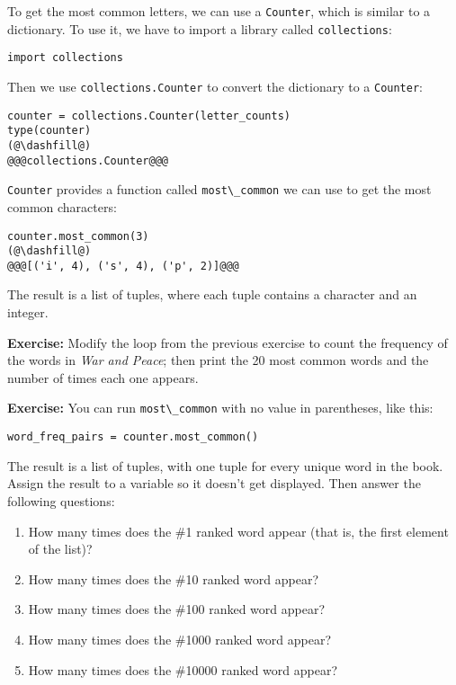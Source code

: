 To get the most common letters, we can use a
\passthrough{\lstinline!Counter!}, which is similar to a dictionary. To
use it, we have to import a library called
\passthrough{\lstinline!collections!}:

\begin{lstlisting}[]
import collections
\end{lstlisting}

Then we use \passthrough{\lstinline!collections.Counter!} to convert the
dictionary to a \passthrough{\lstinline!Counter!}:

\begin{lstlisting}[]
counter = collections.Counter(letter_counts)
type(counter)
(@\dashfill@)
@@@collections.Counter@@@
\end{lstlisting}

\passthrough{\lstinline!Counter!} provides a function called
\passthrough{\lstinline!most\_common!} we can use to get the most common
characters:

\begin{lstlisting}[]
counter.most_common(3)
(@\dashfill@)
@@@[('i', 4), ('s', 4), ('p', 2)]@@@
\end{lstlisting}

The result is a list of tuples, where each tuple contains a character
and an integer.

\textbf{Exercise:} Modify the loop from the previous exercise to count
the frequency of the words in \emph{War and Peace}; then print the 20
most common words and the number of times each one appears.

\textbf{Exercise:} You can run \passthrough{\lstinline!most\_common!}
with no value in parentheses, like this:

\begin{lstlisting}
word_freq_pairs = counter.most_common()
\end{lstlisting}

The result is a list of tuples, with one tuple for every unique word in
the book. Assign the result to a variable so it doesn't get displayed.
Then answer the following questions:

\begin{enumerate}
\def\labelenumi{\arabic{enumi}.}
\item
  How many times does the \#1 ranked word appear (that is, the first
  element of the list)?
\item
  How many times does the \#10 ranked word appear?
\item
  How many times does the \#100 ranked word appear?
\item
  How many times does the \#1000 ranked word appear?
\item
  How many times does the \#10000 ranked word appear?
\end{enumerate}

